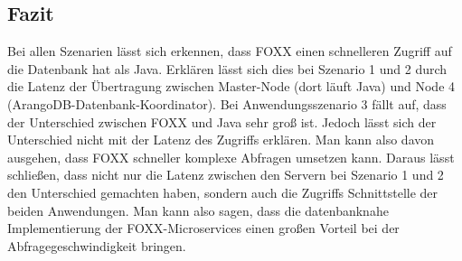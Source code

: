 \subsection{Fazit}
Bei allen Szenarien lässt sich erkennen, dass FOXX einen schnelleren Zugriff auf die Datenbank hat als Java. Erklären lässt sich dies bei Szenario 1 und 2 durch die Latenz der Übertragung zwischen Master-Node (dort läuft Java) und Node 4 (ArangoDB-Datenbank-Koordinator). \newline
Bei Anwendungsszenario 3 fällt auf, dass der Unterschied zwischen FOXX und Java sehr groß ist. Jedoch lässt sich der Unterschied nicht mit der Latenz des Zugriffs erklären. Man kann also davon ausgehen, dass FOXX schneller komplexe Abfragen umsetzen kann. \newline
Daraus lässt schließen, dass nicht nur die Latenz zwischen den Servern bei Szenario 1 und 2 den Unterschied gemachten haben, sondern auch die Zugriffs Schnittstelle der beiden Anwendungen. Man kann also sagen, dass die datenbanknahe Implementierung der FOXX-Microservices einen großen Vorteil bei der Abfragegeschwindigkeit bringen.